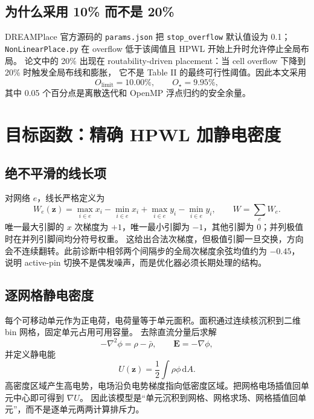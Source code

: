 \documentclass[UTF8,fontset=windows,a4paper,11pt]{ctexart}
\newcommand{\code}[1]{\texttt{#1}}
\begin{document}
\subsection{为什么采用 10\% 而不是 20\%}

DREAMPlace 官方源码的 \code{params.json} 把 \code{stop\_overflow} 默认值设为 0.1；
\code{NonLinearPlace.py} 在 overflow 低于该阈值且 HPWL 开始上升时允许停止全局布局。
论文中的 20\% 出现在 routability-driven placement：当 cell overflow 下降到 20\% 时触发全局布线和膨胀，
它不是 Table II 的最终可行性阈值。因此本文采用
\begin{equation}
  O_{\mathrm{limit}}=10.00\%,\qquad O_\star=9.95\%,
\end{equation}
其中 0.05 个百分点是离散迭代和 OpenMP 浮点归约的安全余量。

\section{目标函数：精确 HPWL 加静电密度}

\subsection{绝不平滑的线长项}

对网络 $e$，线长严格定义为
\begin{equation}
 W_e(\bm z)=\max_{i\in e}x_i-\min_{i\in e}x_i+
             \max_{i\in e}y_i-\min_{i\in e}y_i,
 \qquad W=\sum_e W_e.
 \label{eq:hpwl}
\end{equation}
唯一最大引脚的 $x$ 次梯度为 $+1$，唯一最小引脚为 $-1$，其他引脚为 0；并列极值时在并列引脚间均分符号权重。
这给出合法次梯度，但极值引脚一旦交换，方向会不连续翻转。此前诊断中相邻两个间隔步的全局次梯度余弦均值约为 $-0.45$，
说明 active-pin 切换不是偶发噪声，而是优化器必须长期处理的结构。

\subsection{逐网格静电密度}

每个可移动单元作为正电荷，电荷量等于单元面积。面积通过连续核沉积到二维 bin 网格，固定单元占用可用容量。
去除直流分量后求解
\begin{equation}
 -\nabla^2\phi=\rho-\bar\rho,\qquad \bm E=-\nabla\phi,
 \label{eq:poisson}
\end{equation}
并定义静电能
\begin{equation}
 U(\bm z)=\frac12\int\rho\phi\,\mathrm dA.
\end{equation}
高密度区域产生高电势，电场沿负电势梯度指向低密度区域。把网格电场插值回单元中心即可得到 $\nabla U$。
因此该模型是“单元沉积到网格、网格求场、网格插值回单元”，而不是逐单元两两计算排斥力。
\end{document}
